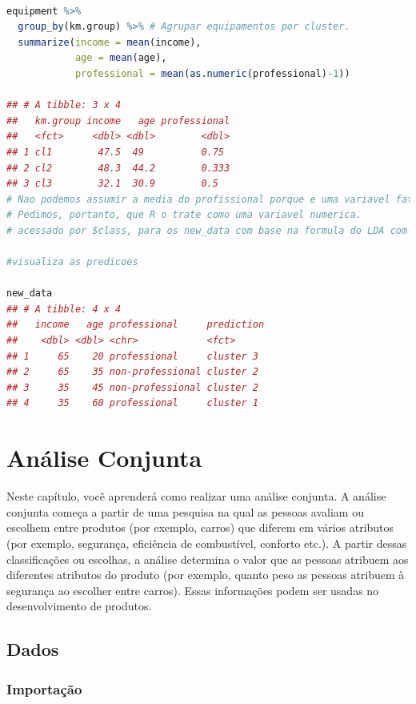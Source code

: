 \documentclass{article}
\begin{document}
\begin{lstlisting}[language=R]

equipment %>% 
  group_by(km.group) %>% # Agrupar equipamentos por cluster.
  summarize(income = mean(income), 
            age = mean(age), 
            professional = mean(as.numeric(professional)-1)) 
            
## # A tibble: 3 x 4
##   km.group income   age professional
##   <fct>     <dbl> <dbl>        <dbl>
## 1 cl1        47.5  49          0.75 
## 2 cl2        48.3  44.2        0.333
## 3 cl3        32.1  30.9        0.5
# Nao podemos assumir a media do profissional porque e uma variavel fator. 
# Pedimos, portanto, que R o trate como uma variavel numerica.
# acessado por $class, para os new_data com base na formula do LDA com base nos dados antigos (use o LDA onde CV = FALSE).

#visualiza as predicoes

new_data
## # A tibble: 4 x 4
##   income   age professional     prediction
##    <dbl> <dbl> <chr>            <fct>     
## 1     65    20 professional     cluster 3 
## 2     65    35 non-professional cluster 2 
## 3     35    45 non-professional cluster 2 
## 4     35    60 professional     cluster 1
\end{lstlisting}

\newpage

\section{Análise Conjunta}

Neste capítulo, você aprenderá como realizar uma análise conjunta. A análise conjunta começa a partir de uma pesquisa na qual as pessoas avaliam ou escolhem entre produtos (por exemplo, carros) que diferem em vários atributos (por exemplo, segurança, eficiência de combustível, conforto etc.). A partir dessas classificações ou escolhas, a análise determina o valor que as pessoas atribuem aos diferentes atributos do produto (por exemplo, quanto peso as pessoas atribuem à segurança ao escolher entre carros). Essas informações podem ser usadas no desenvolvimento de produtos.


\subsection{Dados}

\subsubsection{Importação}
\end{document}
